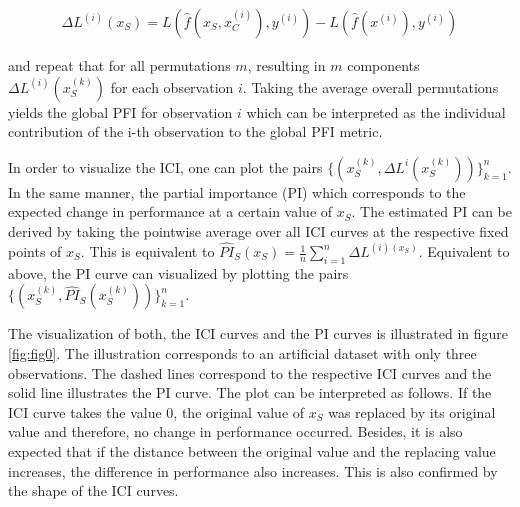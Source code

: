 \documentclass[
]{krantz}
\begin{document}
\begin{align}
\Delta L^{(i)}(x_{S}) = L(\hat{f}(x_{S}, x_{C}^{(i)}), y^{(i)}) - L(\hat{f}(x^{(i)}), y^{(i)})  \label{eq:eq8}\tag{8}
\end{align}

and repeat that for all permutations \(m\), resulting in \(m\) components \(\Delta L^{(i)}(x_{S}^{(k)})\) for each observation \(i\). Taking the average overall permutations yields the global PFI for observation \(i\) which can be interpreted as the individual contribution of the i-th observation to the global PFI metric.

In order to visualize the ICI, one can plot the pairs \(\Big\{(x_{S}^{(k)}, \Delta L^{i}(x_{S}^{(k)}))\Big\}_{k = 1}^{n}\). In the same manner, the partial importance (PI) which corresponds to the expected change in performance at a certain value of \(x_{S}\). The estimated PI can be derived by taking the pointwise average over all ICI curves at the respective fixed points of \(x_{S}\). This is equivalent to \(\widehat{PI}_{S}(x_{S}) = \frac{1}{n}\sum_{i = 1}^{n} \Delta L^{(i) (x_{S})}\). Equivalent to above, the PI curve can visualized by plotting the pairs \(\Big\{(x_{S}^{(k)}, \widehat{PI}_{S}(x_{S}^{(k)}))\Big\}_{k = 1}^{n}\).

The visualization of both, the ICI curves and the PI curves is illustrated in figure \ref{fig:fig0}. The illustration corresponds to an artificial dataset with only three observations. The dashed lines correspond to the respective ICI curves and the solid line illustrates the PI curve. The plot can be interpreted as follows. If the ICI curve takes the value 0, the original value of \(x_{S}\) was replaced by its original value and therefore, no change in performance occurred. Besides, it is also expected that if the distance between the original value and the replacing value increases, the difference in performance also increases. This is also confirmed by the shape of the ICI curves.
\end{document}
